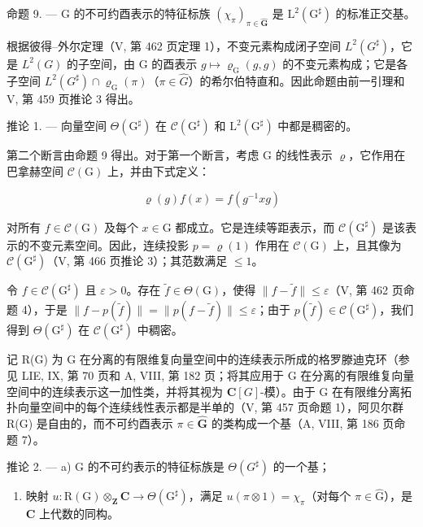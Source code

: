 命题 9. --- G 的不可约酉表示的特征标族 \((\chi_{\pi})_{\pi \in \widehat{\mathbf{G}}}\) 是 \(\mathrm{L}^2 (\mathrm{G}^\sharp)\) 的标准正交基。

根据彼得–外尔定理（V, 第 462 页定理 1），不变元素构成闭子空间 \(L^{2}(G^{\sharp})\)，它是 \(L^{2}(G)\) 的子空间，由 G 的酉表示 \(g \mapsto \varrho_{\mathrm{G}}(g, g)\) 的不变元素构成；它是各子空间 \(L^{2}(G^{\sharp}) \cap \varrho_{\mathrm{G}}(\pi)\)（\(\pi \in \widehat{G}\)）的希尔伯特直和。因此命题由前一引理和 V, 第 459 页推论 3 得出。

推论 1. --- 向量空间 \(\Theta(\mathrm{G}^{\sharp})\) 在 \(\mathcal{C}(\mathrm{G}^{\sharp})\) 和 \(\mathrm{L}^{2}(\mathrm{G}^{\sharp})\) 中都是稠密的。

第二个断言由命题 9 得出。对于第一个断言，考虑 G 的线性表示 \(\varrho\)，它作用在巴拿赫空间 \(\mathcal{C}(\mathrm{G})\) 上，并由下式定义：

\[
\varrho (g) f (x) = f (g ^ {- 1} x g)
\]

对所有 \(f \in \mathcal{C}(\mathrm{G})\) 及每个 \(x \in \mathrm{G}\) 都成立。它是连续等距表示，而 \(\mathcal{C}(\mathrm{G}^{\sharp})\) 是该表示的不变元素空间。因此，连续投影 \(p = \varrho(1)\) 作用在 \(\mathcal{C}(\mathrm{G})\) 上，且其像为 \(\mathcal{C}(\mathrm{G}^{\sharp})\)（V, 第 466 页推论 3）；其范数满足 \(\leqslant 1\)。

令 \(f \in \mathcal{C}(\mathrm{G}^{\sharp})\) 且 \(\varepsilon > 0\)。存在 \(\widetilde{f} \in \Theta(\mathrm{G})\)，使得 \(\|f - \widetilde{f}\| \leqslant \varepsilon\)（V, 第 462 页命题 4），于是 \(\|f - p(\widetilde{f})\| = \|p(f - \widetilde{f})\| \leqslant \varepsilon\)；由于 \(p(\widetilde{f}) \in \mathcal{C}(\mathrm{G}^{\sharp})\)，我们得到 \(\Theta(\mathrm{G}^{\sharp})\) 在 \(\mathcal{C}(\mathrm{G}^{\sharp})\) 中稠密。

记 R(G) 为 G 在分离的有限维复向量空间中的连续表示所成的格罗滕迪克环（参见 LIE, IX, 第 70 页和 A, VIII, 第 182 页；将其应用于 G 在分离的有限维复向量空间中的连续表示这一加性类，并将其视为 \(\mathbf{C}[G]\)-模）。由于 G 在有限维分离拓扑向量空间中的每个连续线性表示都是半单的（V, 第 457 页命题 1），阿贝尔群 R(G) 是自由的，而不可约酉表示 \(\pi \in \widehat{\mathbf{G}}\) 的类构成一个基（A, VIII, 第 186 页命题 7）。

推论 2. --- a) G 的不可约表示的特征标族是 \(\Theta(G^{\sharp})\) 的一个基；

\begin{enumerate}
\def\labelenumi{\alph{enumi})}
\setcounter{enumi}{1}
\tightlist
\item
  映射 \(u: \mathrm{R}(\mathrm{G}) \otimes_{\mathbf{Z}} \mathbf{C} \to \Theta(\mathrm{G}^{\sharp})\)，满足 \(u(\pi \otimes 1) = \chi_{\pi}\)（对每个 \(\pi \in \widehat{\mathrm{G}}\)），是 \(\mathbf{C}\) 上代数的同构。
\end{enumerate}

